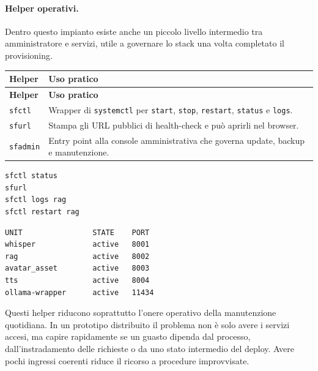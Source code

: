 \paragraph{Helper operativi.}
Dentro questo impianto esiste anche un piccolo livello intermedio tra amministratore e servizi, utile a governare lo stack una volta completato il provisioning.

\par\begingroup
\small
\setlength{\LTleft}{0pt}
\setlength{\LTright}{0pt}
\captionsetup{type=table}
\label{tab:appendix-ops-helpers}
\begin{longtable}{|>{\raggedright\arraybackslash}p{}|>{\raggedright\arraybackslash}p{}|}
\hline
\textbf{Helper} & \textbf{Uso pratico} \\
\hline
\endfirsthead
\hline
\textbf{Helper} & \textbf{Uso pratico} \\
\hline
\endhead
\texttt{sfctl} & Wrapper di \texttt{systemctl} per \texttt{start}, \texttt{stop}, \texttt{restart}, \texttt{status} e \texttt{logs}. \\
\hline
\texttt{sfurl} & Stampa gli URL pubblici di health-check e può aprirli nel browser. \\
\hline
\texttt{sfadmin} & Entry point alla console amministrativa che governa update, backup e manutenzione. \\
\hline
\end{longtable}
\par\endgroup

\begin{lstlisting}[style=sfterminal,title={Console Ubuntu - diagnosi rapida},caption={Sequenza minima di diagnosi nel deploy Ubuntu.}]
sfctl status
sfurl
sfctl logs rag
sfctl restart rag
\end{lstlisting}

\begin{lstlisting}[style=sfterminal,title={Console Ubuntu - sfctl status},caption={Esempio compatto di stato dei servizi dopo il provisioning.}]
UNIT                STATE    PORT
whisper             active   8001
rag                 active   8002
avatar_asset        active   8003
tts                 active   8004
ollama-wrapper      active   11434
\end{lstlisting}

Questi helper riducono soprattutto l'onere operativo della manutenzione quotidiana. In un prototipo distribuito il problema non è solo avere i servizi accesi, ma capire rapidamente se un guasto dipenda dal processo, dall'instradamento delle richieste o da uno stato intermedio del deploy. Avere pochi ingressi coerenti riduce il ricorso a procedure improvvisate.

